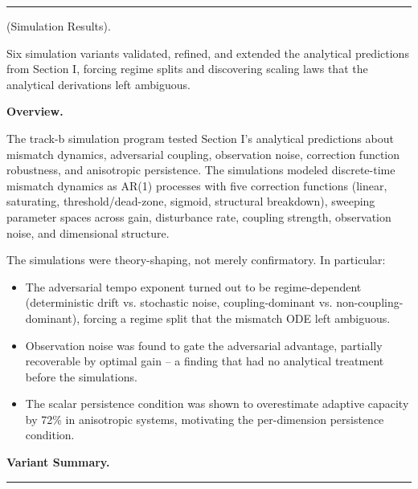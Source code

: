 \documentclass[11pt,oneside]{article}
\newcounter{claim}[section]
\renewcommand{\theclaim}{\thesection.\arabic{claim}}
\newenvironment{segment}[2]{%
  \refstepcounter{claim}%
  \bigskip\noindent\hrule\smallskip
  \noindent{\bfseries #1~\theclaim}\enskip(#2).\par\smallskip
  \noindent\ignorespaces
}{%
  \par\smallskip\noindent\hrule\bigskip
}
\newenvironment{detail}[1][]{\begin{segment}{Detail}{#1}}{\end{segment}}
\begin{document}
\begin{detail}[Simulation Results]
\label{simulation-results}
Six simulation variants validated, refined, and extended the analytical predictions from Section I, forcing regime splits and discovering scaling laws that the analytical derivations left ambiguous.



\medskip\noindent\textbf{Overview.}


The track-b simulation program tested Section I's analytical predictions about mismatch dynamics, adversarial coupling, observation noise, correction function robustness, and anisotropic persistence. The simulations modeled discrete-time mismatch dynamics as AR(1) processes with five correction functions (linear, saturating, threshold/dead-zone, sigmoid, structural breakdown), sweeping parameter spaces across gain, disturbance rate, coupling strength, observation noise, and dimensional structure.

The simulations were theory-shaping, not merely confirmatory. In particular:

\begin{itemize}
  \item The adversarial tempo exponent turned out to be regime-dependent (deterministic drift vs. stochastic noise, coupling-dominant vs. non-coupling-dominant), forcing a regime split that the mismatch ODE left ambiguous.
  \item Observation noise was found to gate the adversarial advantage, partially recoverable by optimal gain -- a finding that had no analytical treatment before the simulations.
  \item The scalar persistence condition was shown to overestimate adaptive capacity by 72\% in anisotropic systems, motivating the per-dimension persistence condition.
\end{itemize}



\medskip\noindent\textbf{Variant Summary.}



\end{detail}
\end{document}

